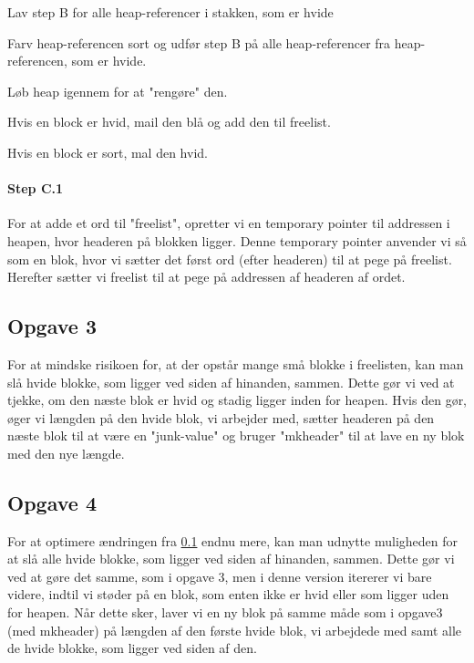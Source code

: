 \begin{my_description}
\item[Step A] Lav step B for alle heap-referencer i stakken, som er hvide
\item[Step B] Farv heap-referencen sort og udfør step B på alle heap-referencer fra heap-referencen, som er hvide.
\item[Step C] Løb heap igennem for at "rengøre" den.
	\begin{my_description}
	\item[Step C.1] Hvis en block er hvid, mail den blå og add den til freelist.
	\item[Step C.2] Hvis en block er sort, mal den hvid.
	\end{my_description}
\end{my_description}

\paragraph{Step C.1}
For at adde et ord til "freelist", opretter vi en temporary pointer til addressen i heapen, hvor headeren på blokken ligger. Denne temporary pointer anvender vi så som en blok, hvor vi sætter det først ord (efter headeren) til at pege på freelist. Herefter sætter vi freelist til at pege på addressen af headeren af ordet.

\subsection{Opgave 3}
\label{O2_3}
For at mindske risikoen for, at der opstår mange små blokke i freelisten, kan man slå hvide blokke, som ligger ved siden af hinanden, sammen. Dette gør vi ved at tjekke, om den næste blok er hvid og stadig ligger inden for heapen. Hvis den gør, øger vi længden på den hvide blok, vi arbejder med, sætter headeren på den næste blok til at være en "junk-value" og bruger "mkheader" til at lave en ny blok med den nye længde.
 
\subsection{Opgave 4}
\label{O2_4}
For at optimere ændringen fra \ref{O2_3} endnu mere, kan man udnytte muligheden for at slå alle hvide blokke, som ligger ved siden af hinanden, sammen. Dette gør vi ved at gøre det samme, som i opgave 3, men i denne version itererer vi bare videre, indtil vi støder på en blok, som enten ikke er hvid eller som ligger uden for heapen. Når dette sker, laver vi en ny blok på samme måde som i opgave3 (med mkheader) på længden af den første hvide blok, vi arbejdede med samt alle de hvide blokke, som ligger ved siden af den.


